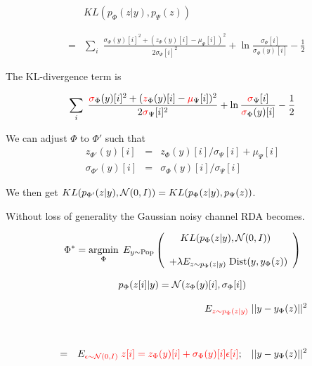 {\begin{eqnarray*}
& & KL(p_\Phi(z|y),p_\Psi(z)) \\
\\
\\
& = & \sum_i \;\frac{\sigma_\Phi(y)[i]^2 + (z_\Phi(y)[i]-\mu_\Psi[i])^2}{2 \sigma_\Psi[i]^2}
+ \ln\frac{\sigma_\Psi[i]}{\sigma_\Phi(y)[i]} - \frac{1}{2}
\end{eqnarray*}



The KL-divergence term is
    
$$\sum_i \;\frac{{\color{red} \sigma}_\Phi(y)[i]^2 +({\color{red}
z}_\Phi(y)[i] - {\color{red} \mu}_\Psi[i])^2}{2
{\color{red} \sigma}_\Psi[i]^2}
+ \ln\frac{{\color{red} \sigma}_\Psi[i]}{{\color{red} \sigma}_\Phi(y)[i]}
- \frac{1}{2}$$

\vfill
We can adjust $\Phi$ to $\Phi'$ such that
\begin{eqnarray*}
z_{\Phi'}(y)[i] & = & z_\Phi(y)[i]/\sigma_\Psi[i] + \mu_\Psi[i] \\
\sigma_{\Phi'}(y)[i] & = & \sigma_\Phi(y)[i]/\sigma_\Psi[i]
\end{eqnarray*}

\vfill
We then get {\color{red} $KL(p_{\Phi'}(z|y),{\cal N}(0,I)) = KL(p_{\Phi}(z|y),p_\Psi(z))$}.


\vfill
Without loss of generality the Gaussian noisy channel RDA becomes.

{\color{red} $$\Phi^* = \operatorname*{argmin}_{\Phi}\; E_{y \sim \mathrm{Pop}}\left(\begin{array}{l}\;\;\;\;KL(p_\Phi(z|y),{\cal N}(0,I)) \\
\\
+ \lambda E_{z \sim p_\Phi(z|y)}\;\mathrm{Dist}(y,y_\Phi(z))\end{array}\right) $$}


$$p_\Phi(z[i]|y) = {\cal N}(z_\Phi(y)[i],\sigma_\Phi[i])$$

\vfill
\begin{eqnarray*}
& & E_{\color{red} z \sim p_\Phi(z|y)} \;||y - y_\Phi(z)||^2 \\
\\
\\
& = & E_{\color{red} \epsilon \sim {\cal N}(0,I)} \;{\color{red} z[i] = z_\Phi(y)[i] + \sigma_\Phi(y)[i]\epsilon[i]};\;\; \;||y -y_\Phi(z)||^2
\end{eqnarray*}

}
